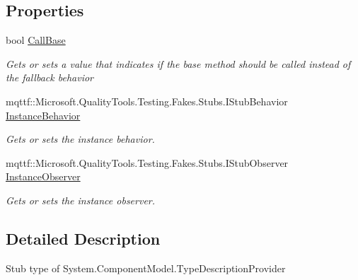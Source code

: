 \subsection*{Properties}
\begin{DoxyCompactItemize}
\item 
bool \hyperlink{class_system_1_1_component_model_1_1_fakes_1_1_stub_type_description_provider_a17d9ff3c335afbaaa584839a4d3c1b7a}{Call\-Base}
\begin{DoxyCompactList}\small\item\em Gets or sets a value that indicates if the base method should be called instead of the fallback behavior\end{DoxyCompactList}\item 
mqttf\-::\-Microsoft.\-Quality\-Tools.\-Testing.\-Fakes.\-Stubs.\-I\-Stub\-Behavior \hyperlink{class_system_1_1_component_model_1_1_fakes_1_1_stub_type_description_provider_a54b42f8ce919d883516010f1d9e6a2d5}{Instance\-Behavior}
\begin{DoxyCompactList}\small\item\em Gets or sets the instance behavior.\end{DoxyCompactList}\item 
mqttf\-::\-Microsoft.\-Quality\-Tools.\-Testing.\-Fakes.\-Stubs.\-I\-Stub\-Observer \hyperlink{class_system_1_1_component_model_1_1_fakes_1_1_stub_type_description_provider_a17f028ec0fc064978f8c396a2819b925}{Instance\-Observer}
\begin{DoxyCompactList}\small\item\em Gets or sets the instance observer.\end{DoxyCompactList}\end{DoxyCompactItemize}


\subsection{Detailed Description}
Stub type of System.\-Component\-Model.\-Type\-Description\-Provider



